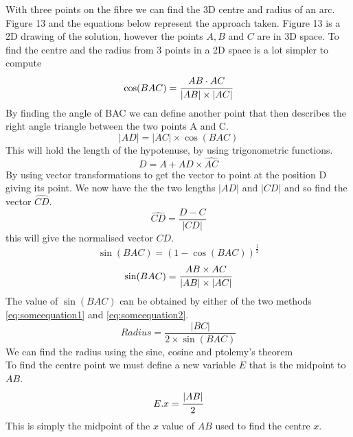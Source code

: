 \documentclass[12pt]{article} %
\begin{document}
\begin{flushleft}
With three points on the fibre we can find the 3D centre and radius of an arc. Figure 13 and the equations below represent the approach taken. Figure 13 is a 2D drawing of the solution, however the points $A, B$ and $C$ are in 3D space. To find the centre and the radius from 3 points in a 2D space is a lot simpler to compute
\newpage
\begin{equation} \label{eq:someequation}
\cos(BAC) =  \cfrac{AB \cdot AC}{|AB| \times |AC|}
\end{equation}
By finding the angle of BAC we can define another point that then describes the right angle triangle between the two points A and C.
\begin{equation} \label{eq:someequation}
|AD| = |AC| \times \cos(BAC)
\end{equation}
This will hold the length of the hypotenuse, by using trigonometric functions. 
\begin{equation} \label{eq:someequation}
D = A + AD \times \hat{AC}
\end{equation}
By using vector transformations to get the vector to point at the position D giving its point.
We now have the the two lengths $|AD|$ and $|CD|$ and so find the vector $\hat{CD}$.
\begin{equation} \label{eq:someequation}
\hat{CD} = \frac{D - C}{ |CD|}
\end{equation}
this will give the normalised vector $CD$.
\begin{equation} \label{eq:someequation1}
\sin(BAC) = (1 - \cos(BAC))^\frac{1}{2}
\end{equation}
\begin{equation} \label{eq:someequation2}
\sin(BAC) =  \cfrac{AB \times AC}{|AB| \times |AC|}
\end{equation}
The value of $\sin(BAC)$ can be obtained by either of the two methods \eqref{eq:someequation1} and \eqref{eq:someequation2}.
\begin{equation} \label{eq:someequation}
Radius = \frac{|BC|}{2 \times \sin(BAC)}
\end{equation}
We can find the radius using the sine, cosine and ptolemy's theorem \cite{maths:sine}\\
To find the centre point we must define a new variable $E$ that is the midpoint to $AB$.
\begin{equation} \label{eq:someequation}
E.x = \cfrac{|AB|}{2}
\end{equation}
This is simply the midpoint of the $x$ value of $AB$ used to find the centre $x$.
\begin{equation} \label{eq:someequation}

\end{equation}
\end{flushleft}
\end{document}
